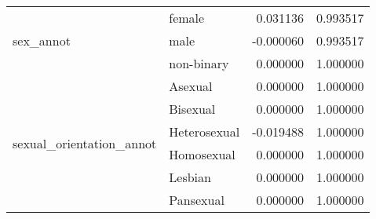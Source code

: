 \begin{longtable}{llrr}
\multirow[t]{3}{*}{sex_annot} & female & 0.031136 & 0.993517 \\
 & male & -0.000060 & 0.993517 \\
 & non-binary & 0.000000 & 1.000000 \\
\cline{1-4}
\multirow[t]{6}{*}{sexual_orientation_annot} & Asexual & 0.000000 & 1.000000 \\
 & Bisexual & 0.000000 & 1.000000 \\
 & Heterosexual & -0.019488 & 1.000000 \\
 & Homosexual & 0.000000 & 1.000000 \\
 & Lesbian & 0.000000 & 1.000000 \\
 & Pansexual & 0.000000 & 1.000000 \\
\cline{1-4}
\end{longtable}
